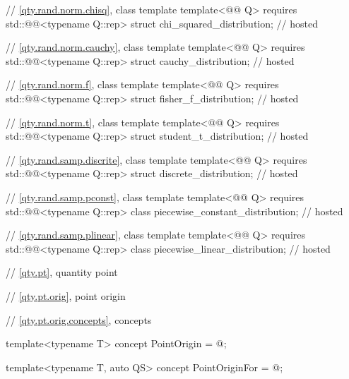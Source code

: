 \begin{codeblock}
{// \ref{qty.rand.norm.chisq}, class template 
template<@@ Q>
  requires std::@@<typename Q::rep>
struct chi_squared_distribution;                                                        // hosted

// \ref{qty.rand.norm.cauchy}, class template 
template<@@ Q>
  requires std::@@<typename Q::rep>
struct cauchy_distribution;                                                             // hosted

// \ref{qty.rand.norm.f}, class template 
template<@@ Q>
  requires std::@@<typename Q::rep>
struct fisher_f_distribution;                                                           // hosted

// \ref{qty.rand.norm.t}, class template 
template<@@ Q>
  requires std::@@<typename Q::rep>
struct student_t_distribution;                                                          // hosted

// \ref{qty.rand.samp.discrite}, class template 
template<@@ Q>
  requires std::@@<typename Q::rep>
struct discrete_distribution;                                                           // hosted

// \ref{qty.rand.samp.pconst}, class template 
template<@@ Q>
  requires std::@@<typename Q::rep>
class piecewise_constant_distribution;                                                  // hosted

// \ref{qty.rand.samp.plinear}, class template 
template<@@ Q>
  requires std::@@<typename Q::rep>
class piecewise_linear_distribution;                                                    // hosted

// \ref{qty.pt}, quantity point

// \ref{qty.pt.orig}, point origin

// \ref{qty.pt.orig.concepts}, concepts

template<typename T>
concept PointOrigin = @\seebelownc@;

template<typename T, auto QS>
concept PointOriginFor = @\seebelownc@;

}
\end{codeblock}
